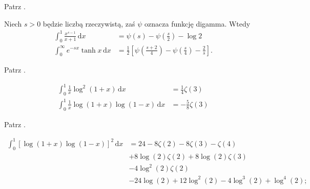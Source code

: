 \begin{solution} %
    Patrz \cite[s. 2]{valean19}. %
\end{solution} %

\begin{problem}
    \label{valean_1_5}%
    Niech $s > 0$ będzie liczbą rzeczywistą, zaś $\psi$ oznacza funkcję digamma.
    Wtedy
    \begin{align}
        \int_0^1 \frac{x^{s-1}}{x+1} \,\mathrm{d} x & = \psi(s) - \psi\left(\frac s2\right) - \log 2 \\
        \int_0^\infty e^{-sx} \tanh x \,\mathrm{d} x & = \frac 1 2 \left[\psi\left(\frac{s+2}{4}\right) - \psi \left(\frac s4 \right) - \frac 2 s\right]. 
    \end{align}
\end{problem}

\begin{solution} %
    Patrz \cite[s. 3]{valean19}. %
\end{solution} %

\begin{problem}
    \label{valean_1_7}%
    \begin{align}
        \int_0^1 \frac{1}{x} \log^2 (1+x) \,\mathrm{d}x & = \frac{1}{4} \zeta(3) \\
        \int_0^1 \frac{1}{x} \log (1+x) \log (1-x) \,\mathrm{d}x & = -\frac{5}{8} \zeta(3)
    \end{align}
\end{problem}

\begin{solution} %
    Patrz \cite[s. 4]{valean19}. %
\end{solution} %

\begin{problem}
    \label{valean_1_8}%
    \begin{align}
        \int_0^1 [\log(1+x) \log(1-x)]^2 \,\mathrm{d} x & =
        24 - 8 \zeta(2)- 8 \zeta(3) - \zeta(4) \\
        & + 8 \log(2)\zeta(2) + 8 \log(2)\zeta(3) \\
        & - 4 \log^2(2)\zeta(2) \\
        & - 24 \log(2) + 12 \log^2(2)- 4 \log^3(2) + \log^4(2); 
    \end{align}
\end{problem}

